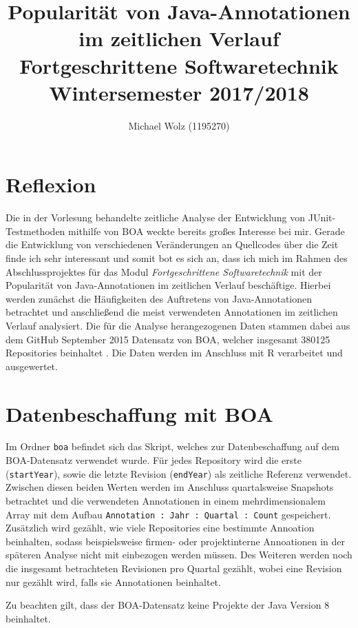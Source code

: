 \documentclass[11pt,a4paper,parskip=full]{scrartcl}
\author{Michael Wolz (1195270)}
\title{Popularität von Java-Annotationen im zeitlichen Verlauf\\\Large{Fortgeschrittene Softwaretechnik}\\ \large{Wintersemester 2017/2018}}
\begin{document}
\maketitle

\section{Reflexion}

Die in der Vorlesung behandelte zeitliche Analyse der Entwicklung von JUnit-Testmetho\-den mithilfe von BOA weckte bereits großes Interesse bei mir. Gerade die Entwicklung von verschiedenen Veränderungen an Quellcodes über die Zeit finde ich sehr interessant und somit bot es sich an, dass ich mich im Rahmen des Abschlussprojektes für das Modul \textit{Fortgeschrittene Softwaretechnik} mit der Popularität von Java-Annotationen im zeitlichen Verlauf beschäftige. Hierbei werden zunächst die Häufigkeiten des Auftretens von Java-Annotationen betrachtet und anschließend die meist verwendeten Annotationen im zeitlichen Verlauf analysiert. Die für die Analyse herangezogenen Daten stammen dabei aus dem GitHub September 2015 Datensatz von BOA, welcher insgesamt 380125 Repositories beinhaltet \cite{boadatasetstats}. Die Daten werden im Anschluss mit R verarbeitet und ausgewertet.

\section{Datenbeschaffung mit BOA}

Im Ordner \texttt{boa} befindet sich das Skript, welches zur Datenbeschaffung auf dem BOA-Datensatz verwendet wurde. Für jedes Repository wird die erste (\texttt{startYear}), sowie die letzte Revision (\texttt{endYear}) als zeitliche Referenz verwendet. Zwischen diesen beiden Werten werden im Anschluss quartalsweise Snapshots betrachtet und die verwendeten Annotationen in einem mehrdimensionalem Array mit dem Aufbau \texttt{Annotation : Jahr : Quartal : Count} gespeichert. Zusätzlich wird gezählt, wie viele Repositories eine bestimmte Annoation beinhalten, sodass beispielsweise firmen- oder projektinterne Annoationen in der späteren Analyse nicht mit einbezogen werden müssen. Des Weiteren werden noch die insgesamt betrachteten Revisionen pro Quartal gezählt, wobei eine Revision nur gezählt wird, falls sie Annotationen beinhaltet. \par

Zu beachten gilt, dass der BOA-Datensatz keine Projekte der Java Version 8 beinhaltet. \cite{boadatasetstats} 
\end{document}
